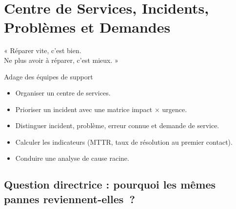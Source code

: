 
\chapter{Centre de Services, Incidents, Problèmes et Demandes}
\label{chap:itil-incidents}

\epigraph{%
    « Réparer vite, c'est bien.\\
    Ne plus avoir à réparer, c'est mieux. »%
}{Adage des équipes de support}


\begin{boxobjectifs}
\begin{itemize}
    \item Organiser un centre de services.
    \item Prioriser un incident avec une matrice impact $\times$ urgence.
    \item Distinguer incident, problème, erreur connue et demande de
          service.
    \item Calculer les indicateurs (MTTR, taux de résolution au premier
          contact).
    \item Conduire une analyse de cause racine.
\end{itemize}
\end{boxobjectifs}

\bigskip

\section*{Question directrice : pourquoi les mêmes pannes reviennent-elles~?}

